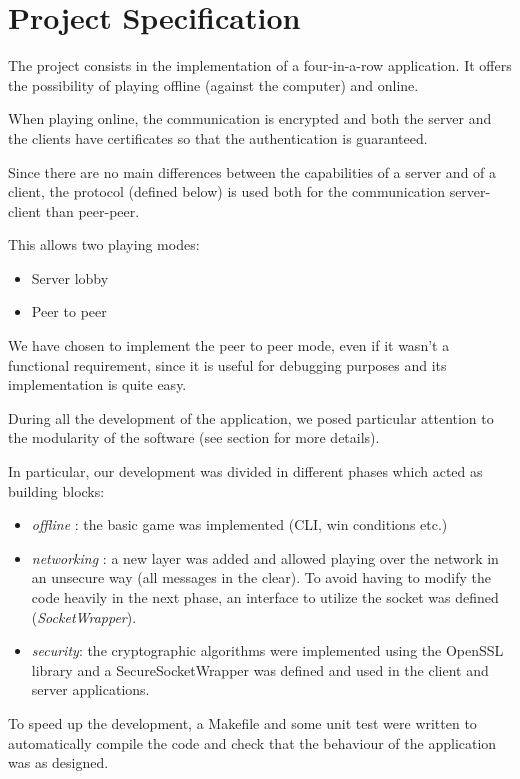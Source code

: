 \section{Project Specification}
The project consists in the implementation of a four-in-a-row application. It offers the possibility of playing offline (against the computer) and online.

When playing online, the communication is encrypted and both the server and the clients have certificates so that the authentication is guaranteed.


Since there are no main differences between the capabilities of a server and of a client, the protocol (defined below) is used both for the communication server-client than peer-peer.

This allows two playing modes:
\begin{itemize}
	\item Server lobby
	\item Peer to peer
\end{itemize}

We have chosen to implement the peer to peer mode, even if it wasn't a functional requirement, since it is useful for debugging purposes and its implementation is quite easy.

During all the development of the application, we posed particular attention to the modularity of the software (see  section for more details).

In particular, our development was divided in different phases which acted as building blocks:
\begin{itemize}
	\item \textit{offline} : the basic game was implemented (CLI, win conditions etc.)
	\item \textit{networking} : a new layer was added and allowed playing over the network in an unsecure way (all messages in the clear). To avoid having to modify the code heavily in the next phase, an interface to utilize the socket was defined (\textit{SocketWrapper}).
	\item \textit{security}: the cryptographic algorithms were implemented using the OpenSSL library and a SecureSocketWrapper was defined and used in the client and server applications.
\end{itemize}

To speed up the development, a Makefile and some unit test were written to automatically compile the code and check that the behaviour of the application was as designed.

